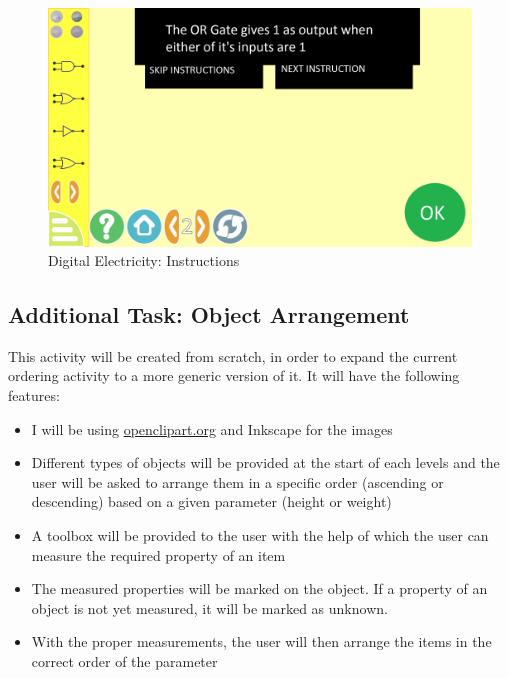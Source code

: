 \documentclass[preprint,12pt]{elsarticle}
\begin{document}
\begin{figure}[H]
\centering\includegraphics[width=1.0\linewidth]{digital_electricity}
\caption{Digital Electricity: Instructions}
\end{figure}

\subsection{ \textbf{Additional Task}: Object Arrangement}

This activity will be created from scratch, in order to expand the current ordering activity to a more generic version of it. It will have the following features:

\begin{itemize}

\item I will be using \href{https://openclipart.org/}{openclipart.org} and Inkscape for the images

\item Different types of objects will be provided at the start of each levels and the user will be asked to arrange them in a specific order (ascending or descending) based on a given parameter (height or weight)

\item A toolbox will be provided to the user with the help of which the user can measure the required property of an item

\item The measured properties will be marked on the object. If a property of an object is not yet measured, it will be marked as unknown.

\item With the proper measurements, the user will then arrange the items in the correct order of the parameter

\end{itemize}
\end{document}
